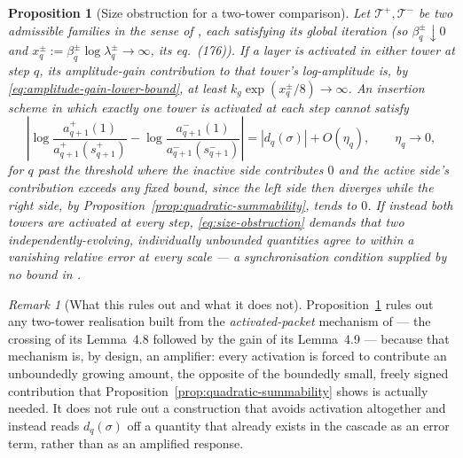 \documentclass[11pt]{amsart}
\numberwithin{equation}{section}
\theoremstyle{plain}
\newtheorem{proposition}[theorem]{Proposition}
\theoremstyle{definition}
\theoremstyle{remark}
\newtheorem{remark}[theorem]{Remark}
\begin{document}
\begin{proposition}[Size obstruction for a two-tower comparison]
\label{prop:size-obstruction}
Let $\mathcal T^+,\mathcal T^-$ be two admissible families in the sense of
\cite{AlpogeBuckmasterCoiculescu2026}, each satisfying its global iteration
(so $\beta_q^\pm\downarrow0$ and $x_q^\pm:=\beta_q^\pm\log\lambda_q^\pm
\to\infty$, its eq.~(176)).  If a layer is activated in either tower at
step $q$, its amplitude-gain contribution to that tower's log-amplitude is,
by \eqref{eq:amplitude-gain-lower-bound}, at least
$k_g\exp(x_q^\pm/8)\to\infty$.  An insertion scheme in which exactly one
tower is activated at each step cannot satisfy
\begin{equation}
\left|
\log\frac{a^+_{q+1}(1)}{a^+_{q+1}(s_{q+1}^+)}
-\log\frac{a^-_{q+1}(1)}{a^-_{q+1}(s_{q+1}^-)}
\right|
=|d_q(\sigma)|+O(\eta_q),\qquad \eta_q\to0,
\label{eq:size-obstruction}
\end{equation}
for $q$ past the threshold where the inactive side contributes $0$ and the
active side's contribution exceeds any fixed bound, since the left side
then diverges while the right side, by
Proposition~\ref{prop:quadratic-summability}, tends to $0$.  If instead both
towers are activated at every step, \eqref{eq:size-obstruction} demands that
two independently-evolving, individually unbounded quantities agree to
within a vanishing relative error at every scale --- a synchronisation
condition supplied by no bound in
\cite{CordobaMartinezZoroa2023,CordobaMartinezZoroaZheng2023,AlpogeBuckmasterCoiculescu2026}.
\end{proposition}

\begin{remark}[What this rules out and what it does not]
\label{rem:size-obstruction-scope}
Proposition~\ref{prop:size-obstruction} rules out any two-tower realisation
built from the \emph{activated-packet} mechanism of
\cite{AlpogeBuckmasterCoiculescu2026} --- the crossing of its Lemma~4.8
followed by the gain of its Lemma~4.9 --- because that mechanism is, by
design, an amplifier: every activation is forced to contribute an
unboundedly growing amount, the opposite of the boundedly small, freely
signed contribution that Proposition~\ref{prop:quadratic-summability} shows
is actually needed.  It does not rule out a construction that avoids
activation altogether and instead reads $d_q(\sigma)$ off a quantity that
already exists in the cascade as an error term, rather than as an amplified
response.
\end{remark}
\end{document}
